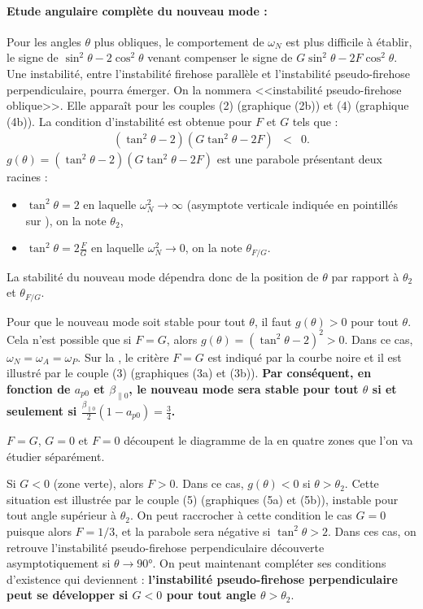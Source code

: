 \paragraph{Etude angulaire complète du nouveau mode : } Pour les angles $\theta$ plus obliques, le comportement de $\omega_N$ est plus difficile à établir, le signe de $\sin^2 \theta - 2 \cos^2 \theta$ venant compenser le signe de $G \sin^2 \theta - 2F \cos^2 \theta$. Une instabilité, entre l'instabilité firehose parallèle et l'instabilité pseudo-firehose perpendiculaire, pourra émerger. On la nommera <<instabilité pseudo-firehose oblique>>. Elle apparaît pour les couples (2) (graphique (2b)) et (4) (graphique (4b)). La condition d'instabilité est obtenue pour $F$ et $G$ tels que :  
\begin{eqnarray}
    (\tan^2 \theta - 2 )(G \tan^2 \theta - 2F ) &<& 0  .
\end{eqnarray}
$g(\theta) = (\tan^2 \theta - 2 )(G \tan^2 \theta - 2F )$ est une parabole présentant deux racines : 
\begin{itemize}
    \item $\tan^2 \theta = 2 $ en laquelle $\omega^2_N \rightarrow \infty$ (asymptote verticale indiquée en pointillés sur ), on la note $\theta_2$,
    \item $\tan^2 \theta = 2\frac{F}{G}$ en laquelle $\omega^2_N \rightarrow 0$, on la note $\theta_{F/G}$.
\end{itemize}
La stabilité du nouveau mode dépendra donc de la position de $\theta$ par rapport à $\theta_2$ et $\theta_{F/G}$. 

Pour que le nouveau mode soit stable pour tout $\theta$, il faut $g(\theta)>0$ pour tout $\theta$. Cela n'est possible que si $F=G$, alors $g(\theta) = (\tan^2 \theta - 2 )^2 >0$. Dans ce cas, $\omega_N = \omega_A = \omega_P$. Sur la , le critère $F=G$ est indiqué par la courbe noire et il est illustré par le couple (3) (graphiques (3a) et (3b)). {\bf Par conséquent, en fonction de $a_{p0}$ et $\beta_{\parallel 0}$, le nouveau mode sera stable pour tout $\theta$ si et seulement si $ \frac{\beta_{\parallel 0}}{2}(1-a_{p0}) = \frac{3}{4} $.}

$F=G$, $G=0$ et $F=0$ découpent le diagramme de la  en quatre zones que l'on va étudier séparément. 

Si $G<0$ (zone verte), alors $F>0$. Dans ce cas, $g(\theta) < 0$ si $\theta > \theta_2$. Cette situation est illustrée par le couple (5) (graphiques (5a) et (5b)), instable pour tout angle supérieur à $\theta_2$. On peut raccrocher à cette condition le cas $G=0$ puisque alors $F=1/3$, et la parabole sera négative si $\tan^2 \theta > 2$. Dans ces cas, on retrouve l'instabilité pseudo-firehose perpendiculaire découverte asymptotiquement si $\theta \rightarrow \ang{90}$. On peut maintenant compléter ses conditions d'existence qui deviennent : {\bf l'instabilité pseudo-firehose perpendiculaire peut se développer si $G<0$ pour tout angle $\theta > \theta_2$}.


